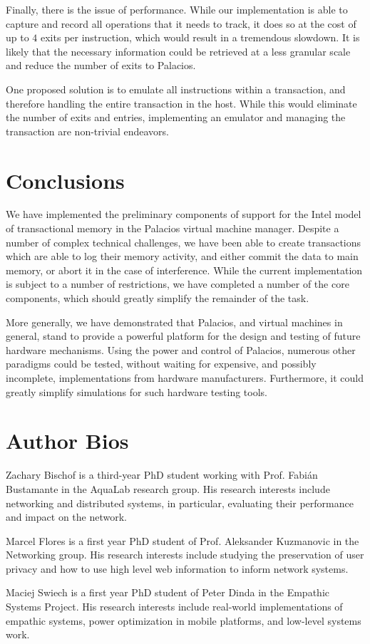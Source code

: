 \documentclass{acm_proc_article-sp}
\begin{document}
Finally, there is the issue of performance. While our implementation is able 
to capture and record all operations that it needs to track, it does so at the
cost of up to $4$ exits per instruction, which would result in a tremendous
slowdown. It is likely that the necessary information could be retrieved at a 
less granular scale and reduce the number of exits to Palacios.

One proposed solution is to emulate all instructions within a transaction,
and therefore handling the entire transaction in the host. While this would
eliminate the number of exits and entries, implementing an emulator and managing
the transaction are non-trivial endeavors. 
  
\section{Conclusions}

We have implemented the preliminary components of support for the Intel model
of transactional memory in the Palacios virtual machine manager. Despite a 
number of complex technical challenges, we have been able to create
transactions which are able to log their memory activity, and either commit
the data to main memory, or abort it in the case of interference. While the
current implementation is subject to a number of restrictions, we have 
completed a number of the core components, which should greatly simplify 
the remainder of the task.

More generally, we have demonstrated that Palacios, and virtual machines in
general, stand to provide a powerful platform for the design and testing of
future hardware mechanisms. Using the power and control of Palacios, numerous
other paradigms could be tested, without waiting for expensive, and possibly
incomplete, implementations from hardware manufacturers. Furthermore, it could
greatly simplify simulations for such hardware testing tools. 

\section{Author Bios}

Zachary Bischof is a third-year PhD student working with Prof. Fabi\'{a}n
Bustamante in the AquaLab research group. His research interests include
networking and distributed systems, in particular, evaluating their performance
and impact on the network.

Marcel Flores is a first year PhD student of Prof. Aleksander Kuzmanovic in the
Networking group. His research interests include studying the preservation of
user privacy and how to use high level web information to inform network
systems.

Maciej Swiech is a first year PhD student of Peter Dinda in the Empathic
Systems Project. His research interests include real-world implementations of
empathic systems, power optimization in mobile platforms, and low-level systems
work.


\end{document}
